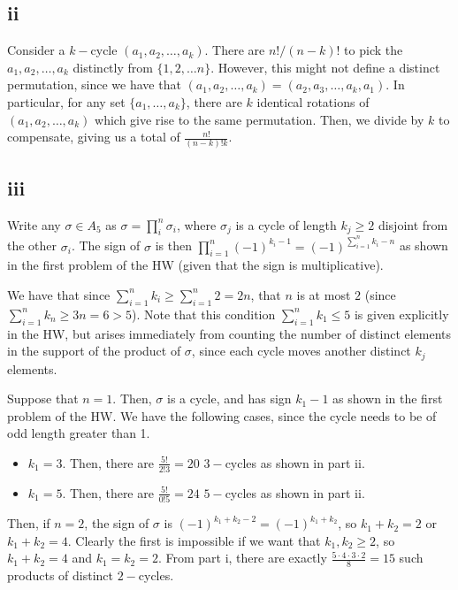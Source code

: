 \documentclass[12pt,letterpaper]{article}
\theoremstyle{definition}
\begin{document}
\subsection*{ii}

Consider a $k-$cycle $(a_{1},a_{2},\dots,a_{k})$. There are $n!/(n-k)!$ to pick the $a_{1}, a_{2},\dots, a_{k}$ distinctly from $\{1,2,\dots n\}$. However, this might not define a distinct permutation, since we have that $(a_{1},a_{2},\dots, a_{k}) = (a_{2},a_{3},\dots,a_{k},a_{1})$. In particular, for any set $\{a_{1}, \dots, a_{k}\}$, there are $k$ identical rotations of $(a_{1}, a_{2}, \dots, a_{k})$ which give rise to the same permutation. Then, we divide by $k$ to compensate, giving us a total of $\frac{n!}{(n-k)!k}$.

\subsection*{iii}

Write any $\sigma \in A_{5}$ as $\sigma = \prod_{i}^{n}\sigma_{i}$, where $\sigma_{j}$ is a cycle of length $k_{j} \geq 2$ disjoint from the other $\sigma_{i}$. The sign of $\sigma$ is then $\prod_{i=1}^{n}(-1)^{k_{i}-1} = (-1)^{\sum_{i=1}^{n}k_{i} - n}$ as shown in the first problem of the HW (given that the sign is multiplicative).

We have that since $\sum_{i=1}^{n}k_{i} \geq \sum_{i=1}^{n}2 = 2n$, that $n$ is at most $2$ (since $\sum_{i=1}^{n}k_{n} \geq 3n = 6 > 5$). Note that this condition $\sum_{i=1}^{n}k_{1} \leq 5$ is given explicitly in the HW, but arises immediately from counting the number of distinct elements in the support of the product of $\sigma$, since each cycle moves another distinct $k_{j}$ elements.

Suppose that $n = 1$. Then, $\sigma$ is a cycle, and has sign $k_{1} - 1$ as shown in the first problem of the HW. We have the following cases, since the cycle needs to be of odd length greater than 1.
\begin{itemize}
  \item $k_{1} = 3$. Then, there are $\frac{5!}{2!3} = 20$ $3-$cycles as shown in part ii.
  \item $k_{1} = 5$. Then, there are $\frac{5!}{0!5} = 24$ $5-$cycles as shown in part ii.
\end{itemize}

Then, if $n = 2$, the sign of $\sigma$ is $(-1)^{k_{1} + k_{2} - 2} = (-1)^{k_{1} + k_{2}}$, so $k_{1} + k_{2} = 2$ or $k_{1} + k_{2} = 4$. Clearly the first is impossible if we want that $k_{1},k_{2} \geq 2$, so $k_{1} + k_{2} = 4$ and $k_{1} = k_{2} = 2$. From part i, there are exactly $\frac{5\cdot 4 \cdot 3 \cdot 2}{8} = 15$ such products of distinct $2-$cycles.
\end{document}
